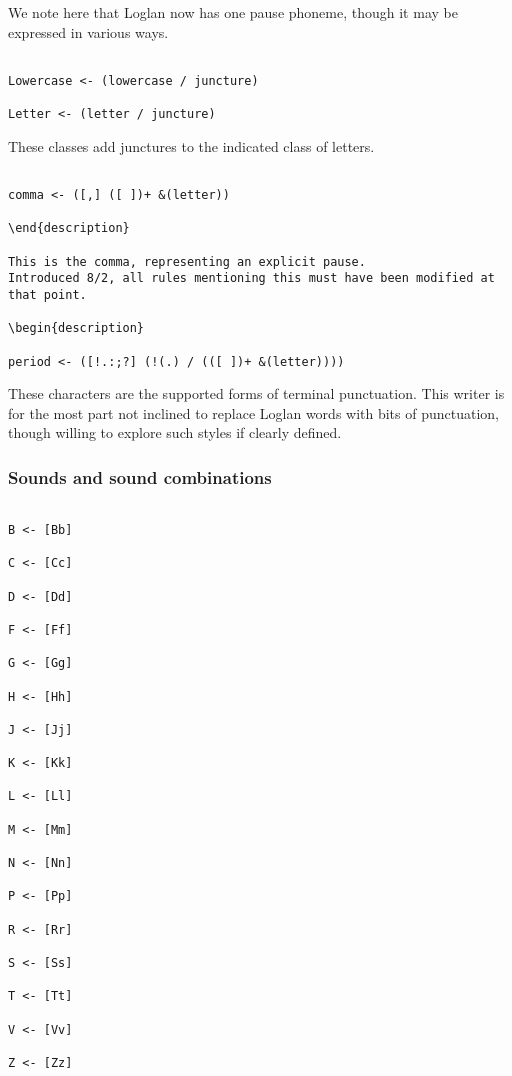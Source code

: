 \documentclass[12pt]{article}
\begin{document}
We note here that Loglan now has one pause phoneme, though it may be expressed in various ways.

\begin{verbatim}

Lowercase <- (lowercase / juncture)

Letter <- (letter / juncture)

\end{verbatim}

These classes add junctures to the indicated class of letters.

\begin{verbatim}

comma <- ([,] ([ ])+ &(letter))

\end{description}

This is the comma, representing an explicit pause.
Introduced 8/2, all rules mentioning this must have been modified at that point.

\begin{description}

period <- ([!.:;?] (!(.) / (([ ])+ &(letter))))

\end{verbatim}

These characters are the supported forms of terminal punctuation.  This writer is for the most part not inclined to replace Loglan words with bits of punctuation, though willing to explore such styles if clearly defined.

\subsubsection{Sounds and sound combinations}

\begin{verbatim}

B <- [Bb]

C <- [Cc]

D <- [Dd]

F <- [Ff]

G <- [Gg]

H <- [Hh]

J <- [Jj]

K <- [Kk]

L <- [Ll]

M <- [Mm]

N <- [Nn]

P <- [Pp]

R <- [Rr]

S <- [Ss]

T <- [Tt]

V <- [Vv]

Z <- [Zz]

\end{verbatim}
\end{document}
